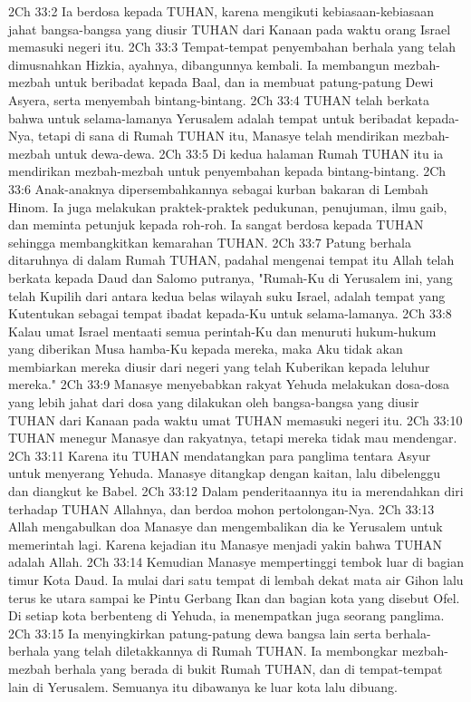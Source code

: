 2Ch 33:2  Ia berdosa kepada TUHAN, karena mengikuti kebiasaan-kebiasaan jahat bangsa-bangsa yang diusir TUHAN dari Kanaan pada waktu orang Israel memasuki negeri itu.
2Ch 33:3  Tempat-tempat penyembahan berhala yang telah dimusnahkan Hizkia, ayahnya, dibangunnya kembali. Ia membangun mezbah-mezbah untuk beribadat kepada Baal, dan ia membuat patung-patung Dewi Asyera, serta menyembah bintang-bintang.
2Ch 33:4  TUHAN telah berkata bahwa untuk selama-lamanya Yerusalem adalah tempat untuk beribadat kepada-Nya, tetapi di sana di Rumah TUHAN itu, Manasye telah mendirikan mezbah-mezbah untuk dewa-dewa.
2Ch 33:5  Di kedua halaman Rumah TUHAN itu ia mendirikan mezbah-mezbah untuk penyembahan kepada bintang-bintang.
2Ch 33:6  Anak-anaknya dipersembahkannya sebagai kurban bakaran di Lembah Hinom. Ia juga melakukan praktek-praktek pedukunan, penujuman, ilmu gaib, dan meminta petunjuk kepada roh-roh. Ia sangat berdosa kepada TUHAN sehingga membangkitkan kemarahan TUHAN.
2Ch 33:7  Patung berhala ditaruhnya di dalam Rumah TUHAN, padahal mengenai tempat itu Allah telah berkata kepada Daud dan Salomo putranya, "Rumah-Ku di Yerusalem ini, yang telah Kupilih dari antara kedua belas wilayah suku Israel, adalah tempat yang Kutentukan sebagai tempat ibadat kepada-Ku untuk selama-lamanya.
2Ch 33:8  Kalau umat Israel mentaati semua perintah-Ku dan menuruti hukum-hukum yang diberikan Musa hamba-Ku kepada mereka, maka Aku tidak akan membiarkan mereka diusir dari negeri yang telah Kuberikan kepada leluhur mereka."
2Ch 33:9  Manasye menyebabkan rakyat Yehuda melakukan dosa-dosa yang lebih jahat dari dosa yang dilakukan oleh bangsa-bangsa yang diusir TUHAN dari Kanaan pada waktu umat TUHAN memasuki negeri itu.
2Ch 33:10  TUHAN menegur Manasye dan rakyatnya, tetapi mereka tidak mau mendengar.
2Ch 33:11  Karena itu TUHAN mendatangkan para panglima tentara Asyur untuk menyerang Yehuda. Manasye ditangkap dengan kaitan, lalu dibelenggu dan diangkut ke Babel.
2Ch 33:12  Dalam penderitaannya itu ia merendahkan diri terhadap TUHAN Allahnya, dan berdoa mohon pertolongan-Nya.
2Ch 33:13  Allah mengabulkan doa Manasye dan mengembalikan dia ke Yerusalem untuk memerintah lagi. Karena kejadian itu Manasye menjadi yakin bahwa TUHAN adalah Allah.
2Ch 33:14  Kemudian Manasye mempertinggi tembok luar di bagian timur Kota Daud. Ia mulai dari satu tempat di lembah dekat mata air Gihon lalu terus ke utara sampai ke Pintu Gerbang Ikan dan bagian kota yang disebut Ofel. Di setiap kota berbenteng di Yehuda, ia menempatkan juga seorang panglima.
2Ch 33:15  Ia menyingkirkan patung-patung dewa bangsa lain serta berhala-berhala yang telah diletakkannya di Rumah TUHAN. Ia membongkar mezbah-mezbah berhala yang berada di bukit Rumah TUHAN, dan di tempat-tempat lain di Yerusalem. Semuanya itu dibawanya ke luar kota lalu dibuang.
